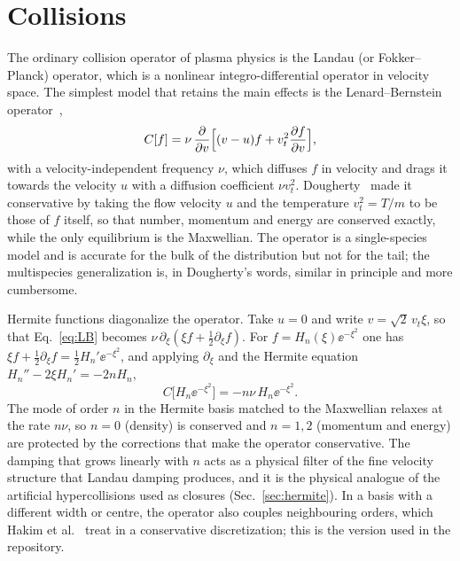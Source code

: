 \section{Collisions}\label{sec:collisions}

The ordinary collision operator of plasma physics is the Landau (or Fokker--Planck) operator, which is a nonlinear integro-differential operator in velocity space. The simplest model that retains the main effects is the Lenard--Bernstein operator~\citep{LenardBernstein1958},
\begin{equation}
C[f]=\nu\,\frac{\partial }{\partial v}\Big[(v-u)f+v_t^2\frac{\partial f}{\partial v}\Big] ,\label{eq:LB}
\end{equation}
with a velocity-independent frequency $\nu$, which diffuses $f$ in velocity and drags it towards the velocity $u$ with a diffusion coefficient $\nu v_t^2$. Dougherty~\citep{Dougherty1964} made it conservative by taking the flow velocity $u$ and the temperature $v_t^2=T/m$ to be those of $f$ itself, so that number, momentum and energy are conserved exactly, while the only equilibrium is the Maxwellian. The operator is a single-species model and is accurate for the bulk of the distribution but not for the tail; the multispecies generalization is, in Dougherty's words, similar in principle and more cumbersome.

Hermite functions diagonalize the operator. Take $u=0$ and write $v=\sqrt2\,v_t\xi$, so that Eq.~\eqref{eq:LB} becomes $\nu\,\partial_\xi(\xi f+\tfrac12\partial_\xi f)$. For $f=H_n(\xi)\ee^{-\xi^2}$ one has $\xi f+\tfrac12\partial_\xi f=\tfrac12H_n'\ee^{-\xi^2}$, and applying $\partial_\xi$ and the Hermite equation $H_n''-2\xi H_n'=-2nH_n$,
\begin{equation}
C\big[H_n\ee^{-\xi^2}\big]=-n\nu\,H_n\ee^{-\xi^2} .\label{eq:LBhermite}
\end{equation}
The mode of order $n$ in the Hermite basis matched to the Maxwellian relaxes at the rate $n\nu$, so $n=0$ (density) is conserved and $n=1,2$ (momentum and energy) are protected by the corrections that make the operator conservative. The damping that grows linearly with $n$ acts as a physical filter of the fine velocity structure that Landau damping produces, and it is the physical analogue of the artificial hypercollisions used as closures (Sec.~\ref{sec:hermite}). In a basis with a different width or centre, the operator also couples neighbouring orders, which Hakim et al.~\citep{Hakim2020} treat in a conservative discretization; this is the version used in the repository.

